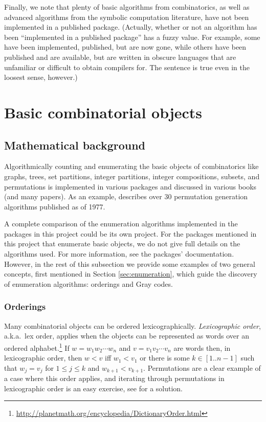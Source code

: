 \documentclass[12pt]{article}
\theoremstyle{plain}
\begin{document}
Finally, we note that plenty of basic algorithms from combinatorics, as well as advanced algorithms from the symbolic computation literature,
have not been implemented in a published package.
(Actually, whether or not an algorithm has been ``implemented in a published package'' has a fuzzy value.
For example, some have been implemented, published, but are now gone,
while others have been published and are available, but are written in obscure languages that are unfamiliar or difficult to obtain compilers for.
The sentence is true even in the loosest sense, however.)





\section{Basic combinatorial objects}
\label{sec:basiccombinatorialobjects}
\subsection{Mathematical background}
Algorithmically counting and enumerating the basic objects of combinatorics like graphs, trees, set partitions, integer partitions, integer compositions, subsets, and permutations is implemented in various packages and discussed in various books \cite{IVA, combinatorialalgorithms, NW78, skiena, W89} (and many papers).
As an example, \cite{SED77} describes over 30 permutation generation algorithms published as of 1977.

A complete comparison of the enumeration algorithms implemented in the packages in this project could be its own project.
For the packages mentioned in this project that enumerate basic objects, we do not give full details on the algorithms  used.
For more information, see the packages' documentation.
However, in the rest of this subsection we provide some examples of
two general concepts, first mentioned in Section \ref{sec:enumeration},
which guide the discovery of
enumeration algorithms: orderings and Gray codes.

\subsubsection{Orderings}
Many combinatorial objects can be ordered lexicographically.
\emph{Lexicographic order}, a.k.a.\ lex order, applies when the objects can be represented as words over an ordered alphabet.\footnote{
 \url{http://planetmath.org/encyclopedia/DictionaryOrder.html}
}
If \(w = w_1 w_2 \cdots w_n \) and \(v = v_1 v_2 \cdots v_n \) are words then, in lexicographic order, then \(w < v \) iff \(w_1 < v_1\) or there is some \( k \in [1..n-1] \) such that \(w_j = v_j \) for \( 1 \leq j \leq k \) and \( w_{k+1} < v_{k+1} \).
Permutations are a clear example of a case where this order applies, and
iterating through permutations in lexicographic order is an easy exercise, see \cite{dijkstra} for a solution.
\end{document}
